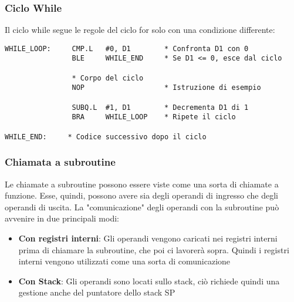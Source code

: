 \subsubsection{Ciclo While}

Il ciclo while segue le regole del ciclo for solo con una condizione differente:
\begin{lstlisting}
WHILE_LOOP:     CMP.L   #0, D1        * Confronta D1 con 0
                BLE     WHILE_END     * Se D1 <= 0, esce dal ciclo

                * Corpo del ciclo
                NOP                   * Istruzione di esempio

                SUBQ.L  #1, D1        * Decrementa D1 di 1
                BRA     WHILE_LOOP    * Ripete il ciclo

WHILE_END:     * Codice successivo dopo il ciclo
\end{lstlisting}


\subsubsection{Chiamata a subroutine}

Le chiamate a subroutine possono essere viste come una sorta di chiamate a funzione. Esse, quindi, possono avere sia degli operandi di ingresso che degli operandi di uscita. La "comunicazione" degli operandi con la subroutine può avvenire in due principali modi:
\begin{itemize}
    \item \textbf{Con registri interni}: Gli operandi vengono caricati nei registri interni prima di chiamare la subroutine, che poi ci lavorerà sopra. Quindi i registri interni vengono utilizzati come una sorta di comunicazione
    \item \textbf{Con Stack}: Gli operandi sono locati sullo stack, ciò richiede quindi una gestione anche del puntatore dello stack SP
\end{itemize}

